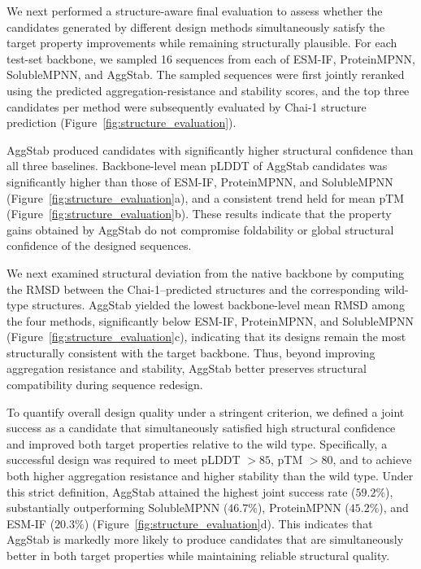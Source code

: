 \documentclass[pdflatex,sn-mathphys-num]{sn-jnl}%
\theoremstyle{thmstyleone}%
\theoremstyle{thmstyletwo}%
\theoremstyle{thmstylethree}%
\begin{document}
We next performed a structure-aware final evaluation to assess whether the candidates generated by different design methods simultaneously satisfy the target property improvements while remaining structurally plausible. For each test-set backbone, we sampled 16 sequences from each of ESM-IF, ProteinMPNN, SolubleMPNN, and AggStab. The sampled sequences were first jointly reranked using the predicted aggregation-resistance and stability scores, and the top three candidates per method were subsequently evaluated by Chai-1 structure prediction (Figure~\ref{fig:structure_evaluation}).

AggStab produced candidates with significantly higher structural confidence than all three baselines. Backbone-level mean pLDDT of AggStab candidates was significantly higher than those of ESM-IF, ProteinMPNN, and SolubleMPNN (Figure~\ref{fig:structure_evaluation}a), and a consistent trend held for mean pTM (Figure~\ref{fig:structure_evaluation}b). These results indicate that the property gains obtained by AggStab do not compromise foldability or global structural confidence of the designed sequences.

We next examined structural deviation from the native backbone by computing the RMSD between the Chai-1--predicted structures and the corresponding wild-type structures. AggStab yielded the lowest backbone-level mean RMSD among the four methods, significantly below ESM-IF, ProteinMPNN, and SolubleMPNN (Figure~\ref{fig:structure_evaluation}c), indicating that its designs remain the most structurally consistent with the target backbone. Thus, beyond improving aggregation resistance and stability, AggStab better preserves structural compatibility during sequence redesign.

To quantify overall design quality under a stringent criterion, we defined a joint success as a candidate that simultaneously satisfied high structural confidence and improved both target properties relative to the wild type. Specifically, a successful design was required to meet pLDDT $> 85$, pTM $> 80$, and to achieve both higher aggregation resistance and higher stability than the wild type. Under this strict definition, AggStab attained the highest joint success rate ($59.2\%$), substantially outperforming SolubleMPNN ($46.7\%$), ProteinMPNN ($45.2\%$), and ESM-IF ($20.3\%$) (Figure~\ref{fig:structure_evaluation}d). This indicates that AggStab is markedly more likely to produce candidates that are simultaneously better in both target properties while maintaining reliable structural quality.
\end{document}
